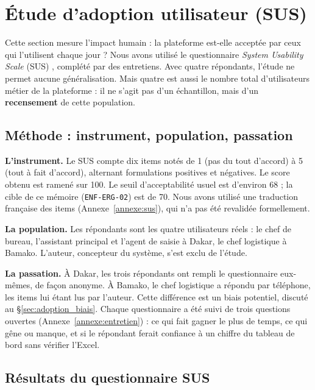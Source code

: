 \section{Étude d'adoption utilisateur (SUS)}
\label{chap:adoption}

Cette section mesure l'impact humain : la plateforme est-elle acceptée par ceux qui l'utilisent chaque jour ? Nous avons utilisé le questionnaire \textit{System Usability Scale} (SUS) \cite{brookeSUSAQuickDirty1996}, complété par des entretiens. Avec quatre répondants, l'étude ne permet aucune généralisation. Mais quatre est aussi le nombre total d'utilisateurs métier de la plateforme : il ne s'agit pas d'un échantillon, mais d'un \textbf{recensement} de cette population.

\subsection{Méthode : instrument, population, passation}
\label{sec:adoption_methode}

\textbf{L'instrument.} Le SUS compte dix items notés de 1 (pas du tout d'accord) à 5 (tout à fait d'accord), alternant formulations positives et négatives. Le score obtenu est ramené sur 100. Le seuil d'acceptabilité usuel est d'environ 68 ; la cible de ce mémoire (\texttt{ENF-ERG-02}) est de 70. Nous avons utilisé une traduction française des items (Annexe~\ref{annexe:sus}), qui n'a pas été revalidée formellement.

\textbf{La population.} Les répondants sont les quatre utilisateurs réels : le chef de bureau, l'assistant principal et l'agent de saisie à Dakar, le chef logistique à Bamako. L'auteur, concepteur du système, s'est exclu de l'étude.

\textbf{La passation.} À Dakar, les trois répondants ont rempli le questionnaire eux-mêmes, de façon anonyme. À Bamako, le chef logistique a répondu par téléphone, les items lui étant lus par l'auteur. Cette différence est un biais potentiel, discuté au §\ref{sec:adoption_biais}. Chaque questionnaire a été suivi de trois questions ouvertes (Annexe~\ref{annexe:entretien}) : ce qui fait gagner le plus de temps, ce qui gêne ou manque, et si le répondant ferait confiance à un chiffre du tableau de bord sans vérifier l'Excel.

\subsection{Résultats du questionnaire SUS}
\label{sec:adoption_resultats}

